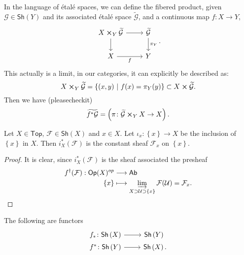 \documentclass[../Main]{subfiles}
\begin{document}
\begin{rem}
	In the language of étalé spaces, we can define the fibered product, 
	given $\mathcal{G} \in \mathsf{Sh}\left(Y\right)$ and its associated
	étalé space $\widetilde{\mathcal{G}}$, and a continuous map $f\colon X \to Y$,
	\begin{equation}
	\begin{tikzcd}
		X \cross_Y \widetilde{\mathcal{G}} \arrow[r, "", rightarrow] 
		\arrow[d, "", rightarrow] &
		\widetilde{\mathcal{G}} \arrow[d, "\pi_Y", rightarrow] \\
		X \arrow[r, "f"', rightarrow] &
		Y
	\end{tikzcd}
	.\end{equation} 
	This actually is a limit, in our categories, it can explicitly be described as:
	\begin{equation}
		X \cross_Y \widetilde{\mathcal{G}} = \left\{ \left( x, y \right) \ \middle|\ 
		f(x) = \pi_Y(y)\right\} \subset X \cross \widetilde{\mathcal{G}}
	.\end{equation} 
	Then we have (pleasecheckit)
	\begin{equation}
		\widetilde{f^*\mathcal{G}} = \left( \pi\colon 
		\widetilde{\mathcal{G}} \cross_Y X\to X \right)
	.\end{equation} 
\end{rem}

\begin{prop}[]
	Let $X \in \mathsf{Top}$, $\mathcal{F} \in \mathsf{Sh}\left(X\right)$ and $x \in X$.
	Let $\iota_x\colon \left\{ x \right\} \to X$ be the inclusion of $\left\{ x \right\}$ in $X$.
	Then $i_X^*(\mathcal{F})$ is the constant sheaf $\mathcal{F}_x$ on $\left\{ x \right\}$.
\end{prop}
\begin{proof}
	It is clear, since $i_X^*(\mathcal{F})$ is the sheaf associated
	the presheaf
	\begin{align}
		f^\dagger(\mathcal{F}): \mathsf{Op}(X)^{op} &\longrightarrow \mathsf{Ab} \\
		\left\{ x \right\} &\longmapsto \varinjlim_{X \supset \mathcal{U} \supset \left\{ x \right\}}
		\mathcal{F}(\mathcal{U}) = \mathcal{F}_x\nonumber\qedhere
	.\end{align} 
\end{proof}

\begin{exr}
	The following are functors
	\begin{equation}
		\begin{tikzcd}[row sep=0.05em]
			f_*\colon \mathsf{Sh}\left(X\right) \arrow[r, "", rightarrow] &
		\mathsf{Sh}\left(Y\right)\ \\
			f^*\colon \mathsf{Sh}\left(Y\right) \arrow[r, "", rightarrow] &
		\mathsf{Sh}\left(X\right).
		\end{tikzcd}
	\end{equation} 
\end{exr} 
\end{document}
